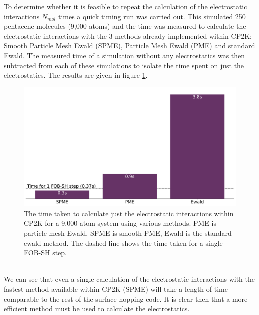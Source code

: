 To determine whether it is feasible to repeat the calculation of the electrostatic interactions $N_{mol}$ times a quick timing run was carried out. This simulated 250 pentacene molecules (9,000 atoms) and the time was measured to calculate the electrostatic interactions with the 3 methods already implemented within CP2K: Smooth Particle Mesh Ewald (SPME), Particle Mesh Ewald (PME) and standard Ewald. The measured time of a simulation without any electrostatics was then subtracted from each of these simulations to isolate the time spent on just the electrostatics. The results are given in figure  \ref{fig:ES_Timings}.
\begin{figure}[ht]
  \includegraphics[width=\textwidth]{../img/ES/InitialTimings.png}
  \caption{\label{fig:ES_Timings}The time taken to calculate just the electrostatic interactions within CP2K for a 9,000 atom system using various methods. PME is particle mesh Ewald, SPME is smooth-PME, Ewald is the standard ewald method. The dashed line shows the time taken for a single FOB-SH step.}
\end{figure}
\\
We can see that even a single calculation of the electrostatic interactions with the fastest method available within CP2K (SPME) will take a length of time comparable to the rest of the surface hopping code. It is clear then that a more efficient method must be used to calculate the electrostatics.
\\
